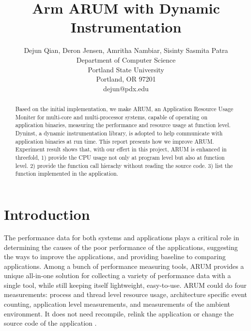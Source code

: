 \documentclass[11pt,letterpaper,oneside]{article}
\title{Arm ARUM with Dynamic Instrumentation}
\author{Dejun Qian, Deron Jensen, Amritha Nambiar, Sisinty Sasmita Patra\\Department of Computer Science\\Portland State University\\Portland, OR 97201\\dejun@pdx.edu}
\begin{document}
\maketitle

\begin{abstract}
Based on the initial implementation, we make ARUM, an Application Resource Usage Moniter for multi-core and multi-processor systems, capable of operating on application binaries, measuring the performance and resource usage at function level. Dyninst, a dynamic instrumentation library, is adopted to help communicate with application binaries at run time. This report presents how we improve ARUM. Experiment result shows that, with our effert in this project, ARUM is enhanced in threefold, 1) provide the CPU usage not only at program level but also at function level. 2) provide the function call hierachy without reading the source code. 3) list the function implemented in the application.
\end{abstract}

\section{Introduction}
\label{sec:introduction}
The performance data for both systems and applications plays a critical role in determining the causes of the poor performance of the applications, suggesting the ways to improve the applications, and providing baseline to comparing applications. Among a bunch of performance measuring tools, ARUM provides a unique all-in-one solution for collecting a variety of performance data with a single tool, while still keeping itself lightweight, easy-to-use. ARUM could do four measurements: process and thread level resource usage, architecture specific event counting, application level measurements, and measurements of the ambient environment. It does not need recompile, relink the application or change the source code of the application \cite{bib:knapp}.
\end{document}
